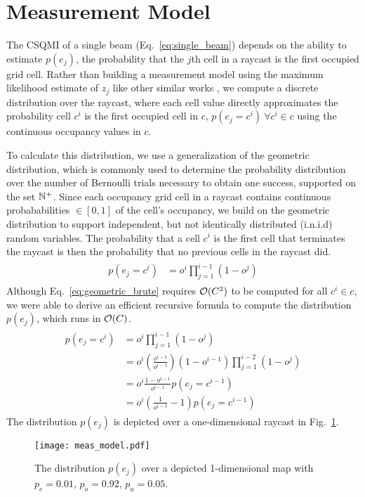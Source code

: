 \section{Measurement Model}
\label{sec:measurement_model}

The CSQMI of a single beam (Eq.~\eqref{eq:single_beam}) depends on the ability
to estimate $p(e_j)$, the probability that the $j$th cell in a raycast is
the first occupied grid cell. Rather than building a measurement model using the
maximum likelihood estimate of $z_{j}$ like other similar works \cite{charrow15,
thrun2005probabilistic, julian2013mutual}, we compute a discrete distribution over the
raycast, where each cell value directly approximates the probability cell $c^i$ is the
first occupied cell in $c$, $p(e_j = c^i) \ \forall c^{i} \in c$ using the
continuous occupancy values in $c$.

To calculate this distribution, we use a generalization of the geometric
distribution, which is commonly used to determine the probability distribution
over the number of Bernoulli trials necessary to obtain one success, supported
on the set ${\mathbb{N}}^{+}$. Since each occupancy grid cell in a raycast contains
continuous probababilities $\in [0, 1]$ of the cell's occupancy, we build on the
geometric distribution to support independent, but not identically distributed
(i.n.i.d) random variables. The probability that a cell $c^{i}$ is the first
cell that terminates the raycast is then the probability that no previous cells
in the raycast did.
%
\begin{align}
  \begin{split}
    p(e_j = c^{i})
    &=
    o^{i}
    \prod_{j=1}^{i-1}
    (1 - o^{j})
    \label{eq:geometric_brute}
  \end{split}
\end{align}
%
Although Eq.~\eqref{eq:geometric_brute} requires $\mathcal{O}(C^2)$ to be
computed for all $c^{i} \in c$, we
were able to derive an efficient recursive formula to compute the distribution $p(e_j)$,
which runs in $\mathcal{O}(C)$.
%
\begin{align}
  \begin{split}
    p(e_j = c^{i})
    &=
    o^{i}
    \prod_{j=1}^{i-1}
    (1 - o^{j}) \\
    &=
    o^{i}
    \left(
    \frac
    {o^{i-1}}
    {o^{i-1}}
    \right)
    (1 - o^{i-1})
    \prod_{j=1}^{i-2}
    (1 - o^{j}) \\
    &=
    o^{i}
    \frac
    {
      1 - o^{i-1}
    }
    {
      o^{i-1}
    }
    p(e_j = c^{i-1}) \\
    &=
    o^{i}
    \left(
    \frac{1}{o^{i-1}}
      -
      1
    \right)
    p(e_j = c^{i-1})
  \end{split}
\end{align}
%
The distribution $p(e_j)$ is depicted over a one-dimensional raycast in Fig.~\ref{fig:measurement_model}.

\begin{figure}
  \centering
  \texttt{[image: meas\_model.pdf]}
  \caption{The distribution $p(e_j)$ over a depicted 1-dimensional map with $p_{e} = 0.01$, $p_{o} = 0.92$, $p_{u} = 0.05$. \label{fig:measurement_model}}
\end{figure}

